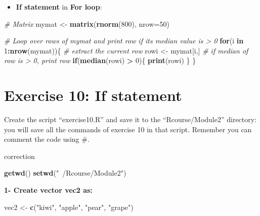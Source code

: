 \documentclass[]{book}
\newenvironment{Shaded}{\begin{snugshade}}{\end{snugshade}}
\newcommand{\CommentTok}[1]{\textcolor[rgb]{0.56,0.35,0.01}{\textit{#1}}}
\newcommand{\ControlFlowTok}[1]{\textcolor[rgb]{0.13,0.29,0.53}{\textbf{#1}}}
\newcommand{\DataTypeTok}[1]{\textcolor[rgb]{0.13,0.29,0.53}{#1}}
\newcommand{\DecValTok}[1]{\textcolor[rgb]{0.00,0.00,0.81}{#1}}
\newcommand{\KeywordTok}[1]{\textcolor[rgb]{0.13,0.29,0.53}{\textbf{#1}}}
\newcommand{\NormalTok}[1]{#1}
\newcommand{\OperatorTok}[1]{\textcolor[rgb]{0.81,0.36,0.00}{\textbf{#1}}}
\newcommand{\StringTok}[1]{\textcolor[rgb]{0.31,0.60,0.02}{#1}}
\providecommand{\tightlist}{%
  \setlength{\itemsep}{0pt}\setlength{\parskip}{0pt}}
\begin{document}
\begin{itemize}
\tightlist
\item
  \textbf{If statement} in \textbf{For loop}:
\end{itemize}

\begin{Shaded}
\begin{Highlighting}[]
\CommentTok{# Matrix}
\NormalTok{mymat <-}\StringTok{ }\KeywordTok{matrix}\NormalTok{(}\KeywordTok{rnorm}\NormalTok{(}\DecValTok{800}\NormalTok{), }
        \DataTypeTok{nrow=}\DecValTok{50}\NormalTok{)}
    
\CommentTok{# Loop over rows of mymat and print row if its median value is > 0}
\ControlFlowTok{for}\NormalTok{(i }\ControlFlowTok{in} \DecValTok{1}\OperatorTok{:}\KeywordTok{nrow}\NormalTok{(mymat))\{}
    \CommentTok{# extract the current row}
\NormalTok{    rowi <-}\StringTok{ }\NormalTok{mymat[i,]}
    \CommentTok{# if median of row is > 0, print row}
    \ControlFlowTok{if}\NormalTok{(}\KeywordTok{median}\NormalTok{(rowi) }\OperatorTok{>}\StringTok{ }\DecValTok{0}\NormalTok{)\{}
        \KeywordTok{print}\NormalTok{(rowi)}
\NormalTok{    \}}
\NormalTok{\}}
\end{Highlighting}
\end{Shaded}

\hypertarget{exercise-10-if-statement}{%
\section{Exercise 10: If statement}\label{exercise-10-if-statement}}

Create the script ``exercise10.R'' and save it to the ``Rcourse/Module2'' directory: you will save all the commands of exercise 10 in that script.
Remember you can comment the code using \#.

correction

\begin{Shaded}
\begin{Highlighting}[]
\KeywordTok{getwd}\NormalTok{()}
\KeywordTok{setwd}\NormalTok{(}\StringTok{"~/Rcourse/Module2"}\NormalTok{)}
\end{Highlighting}
\end{Shaded}

\textbf{1- Create vector vec2 as:}

\begin{Shaded}
\begin{Highlighting}[]
\NormalTok{vec2 <-}\StringTok{ }\KeywordTok{c}\NormalTok{(}\StringTok{"kiwi"}\NormalTok{, }\StringTok{"apple"}\NormalTok{, }\StringTok{"pear"}\NormalTok{, }\StringTok{"grape"}\NormalTok{)}
\end{Highlighting}
\end{Shaded}
\end{document}
